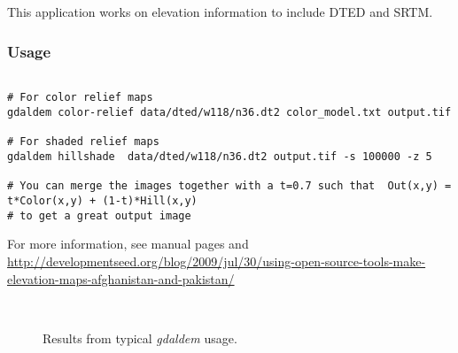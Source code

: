 This application works on elevation information to include DTED and SRTM.

\subsubsection*{Usage}
\begin{verbatim}

# For color relief maps
gdaldem color-relief data/dted/w118/n36.dt2 color_model.txt output.tif

# For shaded relief maps
gdaldem hillshade  data/dted/w118/n36.dt2 output.tif -s 100000 -z 5

# You can merge the images together with a t=0.7 such that  Out(x,y) = t*Color(x,y) + (1-t)*Hill(x,y)
# to get a great output image
\end{verbatim}
For more information, see manual pages and \url{http://developmentseed.org/blog/2009/jul/30/using-open-source-tools-make-elevation-maps-afghanistan-and-pakistan/}

\begin{figure}[!h]
\\
\caption{Results from typical \emph{gdaldem} usage.}
\label{fig:gdaldem_usage}
\end{figure}

